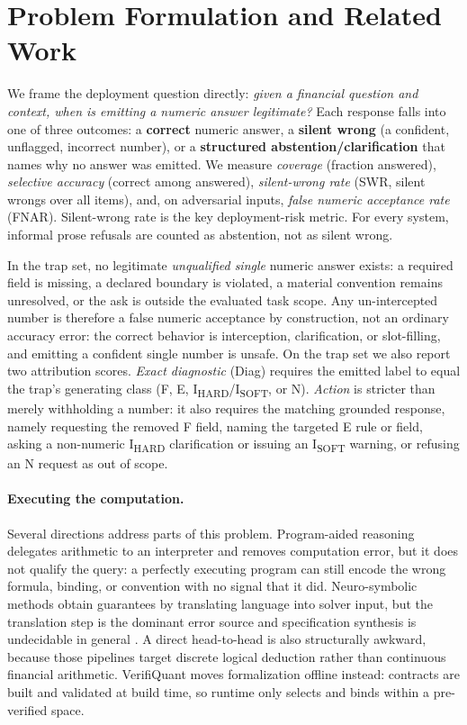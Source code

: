 \documentclass[sigconf,anonymous]{acmart}
\begin{document}
\section{Problem Formulation and Related Work}\label{sec:v2problem}
We frame the deployment question directly: \emph{given a financial question and context, when is emitting a numeric answer legitimate?}
Each response falls into one of three outcomes: a \textbf{correct} numeric answer, a \textbf{silent wrong} (a confident, unflagged, incorrect number), or a \textbf{structured abstention/clarification} that names why no answer was emitted.
We measure \emph{coverage} (fraction answered), \emph{selective accuracy} (correct among answered), \emph{silent-wrong rate} (SWR, silent wrongs over all items), and, on adversarial inputs, \emph{false numeric acceptance rate} (FNAR).
Silent-wrong rate is the key deployment-risk metric. For every system, informal prose refusals are counted as abstention, not as silent wrong.

In the trap set, no legitimate \emph{unqualified single} numeric answer exists: a required field is missing, a declared boundary is violated, a material convention remains unresolved, or the ask is outside the evaluated task scope.
Any un-intercepted number is therefore a false numeric acceptance by construction, not an ordinary accuracy error: the correct behavior is interception, clarification, or slot-filling, and emitting a confident single number is unsafe.
On the trap set we also report two attribution scores. \emph{Exact diagnostic} (Diag) requires the emitted label to equal the trap's generating class (F, E, I\textsubscript{HARD}/I\textsubscript{SOFT}, or N). \emph{Action} is stricter than merely withholding a number: it also requires the matching grounded response, namely requesting the removed F field, naming the targeted E rule or field, asking a non-numeric I\textsubscript{HARD} clarification or issuing an I\textsubscript{SOFT} warning, or refusing an N request as out of scope.

\paragraph{Executing the computation.}
Several directions address parts of this problem. Program-aided reasoning \cite{gao2023pal,chen2023pot} delegates arithmetic to an interpreter and removes computation error, but it does not qualify the query: a perfectly executing program can still encode the wrong formula, binding, or convention with no signal that it did. Neuro-symbolic methods \cite{pan2023logiclm,olausson2023linc,ye2023satlm} obtain guarantees by translating language into solver input, but the translation step is the dominant error source and specification synthesis is undecidable in general \cite{zhou2026formaljudge}. A direct head-to-head is also structurally awkward, because those pipelines target discrete logical deduction rather than continuous financial arithmetic. VerifiQuant moves formalization offline instead: contracts are built and validated at build time, so runtime only selects and binds within a pre-verified space.
\end{document}
